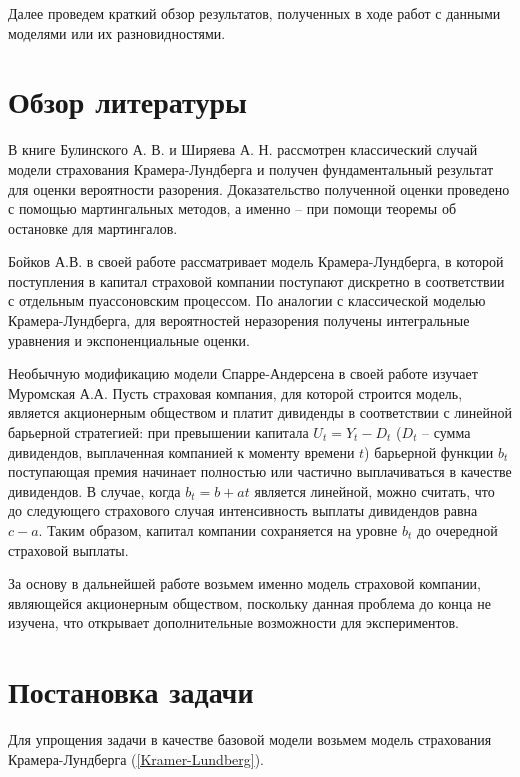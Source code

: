 \documentclass{article}
\theoremstyle{plain}
\theoremstyle{plain}
\theoremstyle{plain}
\theoremstyle{plain}
\theoremstyle{definition}
\theoremstyle{remark}
\begin{document}
Далее проведем краткий обзор результатов, полученных в ходе работ с данными моделями или их разновидностями.
    
\section{Обзор литературы}

В книге Булинского А. В. и Ширяева А. Н. \cite{Shiryaev_stochastic} рассмотрен классический случай модели страхования Крамера-Лундберга и получен фундаментальный результат для оценки вероятности разорения. Доказательство полученной оценки проведено с помощью мартингальных методов, а именно -- при помощи теоремы об остановке для мартингалов. %

Бойков А.В. в своей работе \cite{KL_premium} рассматривает модель Крамера-Лундберга, в которой поступления в капитал страховой компании поступают дискретно в соответствии с отдельным пуассоновским процессом. По аналогии с классической моделью Крамера-Лундберга, для вероятностей неразорения получены интегральные уравнения и экспоненциальные оценки.

Необычную модификацию модели Спарре-Андерсена в своей работе \cite{SA_dividends} изучает Муромская А.А. Пусть страховая компания, для которой строится модель, является акционерным обществом и платит дивиденды в соответствии с линейной барьерной стратегией: при превышении капитала $U_t = Y_t - D_t$ ($D_t$ -- сумма дивидендов, выплаченная компанией к моменту времени $t$) барьерной функции $b_t$ поступающая премия начинает полностью или частично выплачиваться в качестве дивидендов. В случае, когда $b_t = b + at$ является линейной, можно считать, что до следующего страхового случая интенсивность выплаты дивидендов равна $c - a$. Таким образом, капитал компании сохраняется на уровне $b_t$ до очередной страховой выплаты.

За основу в дальнейшей работе возьмем именно модель страховой компании, являющейся акционерным обществом, поскольку данная проблема до конца не изучена, что открывает дополнительные возможности для экспериментов.

\section{Постановка задачи}
\label{Problem_Description}

Для упрощения задачи в качестве базовой модели возьмем модель страхования Крамера-Лундберга (\ref{Kramer-Lundberg}).
\end{document}
